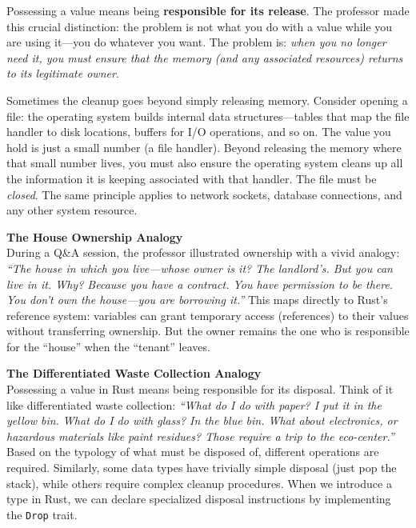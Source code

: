 Possessing a value means being \textbf{responsible for its release}. The professor made this crucial distinction: the problem is not what you do with a value while you are using it---you do whatever you want. The problem is: \emph{when you no longer need it, you must ensure that the memory (and any associated resources) returns to its legitimate owner}.

Sometimes the cleanup goes beyond simply releasing memory. Consider opening a file: the operating system builds internal data structures---tables that map the file handler to disk locations, buffers for I/O operations, and so on. The value you hold is just a small number (a file handler). Beyond releasing the memory where that small number lives, you must also ensure the operating system cleans up all the information it is keeping associated with that handler. The file must be \emph{closed}. The same principle applies to network sockets, database connections, and any other system resource.

\begin{insightbox}
\textbf{The House Ownership Analogy} \\
During a Q\&A session, the professor illustrated ownership with a vivid analogy: \emph{``The house in which you live---whose owner is it? The landlord's. But you can live in it. Why? Because you have a contract. You have permission to be there. You don't own the house---you are borrowing it.''} This maps directly to Rust's reference system: variables can grant temporary access (references) to their values without transferring ownership. But the owner remains the one who is responsible for the ``house'' when the ``tenant'' leaves.
\end{insightbox}

\begin{insightbox}
\textbf{The Differentiated Waste Collection Analogy} \\
Possessing a value in Rust means being responsible for its disposal. Think of it like differentiated waste collection: \emph{``What do I do with paper? I put it in the yellow bin. What do I do with glass? In the blue bin. What about electronics, or hazardous materials like paint residues? Those require a trip to the eco-center.''} Based on the typology of what must be disposed of, different operations are required. Similarly, some data types have trivially simple disposal (just pop the stack), while others require complex cleanup procedures. When we introduce a type in Rust, we can declare specialized disposal instructions by implementing the \texttt{Drop} trait.
\end{insightbox}

